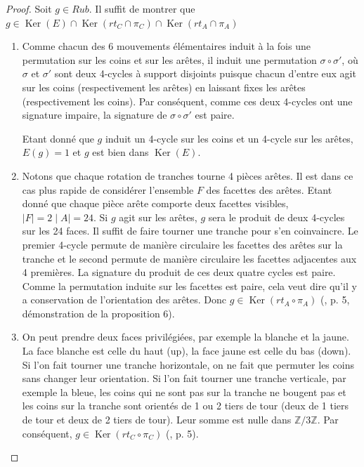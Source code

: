 \documentclass[french]{report}
\begin{document}
  \begin{proof}


    Soit $g \in Rub$. Il suffit de montrer que $g \in  \operatorname{Ker}(E ) \cap \operatorname{Ker}(rt_C \cap \pi_C) \cap \operatorname{Ker}(rt_A \cap \pi_A)$
    \begin{enumerate}
      \item Comme chacun des 6 mouvements élémentaires induit à la fois une permutation sur les coins et sur les arêtes, il induit une permutation $\sigma \circ \sigma'$, où $\sigma$ et $\sigma'$ sont deux 4-cycles à support disjoints puisque chacun d'entre eux agit sur les coins (respectivement les arêtes) en laissant fixes les arêtes (respectivement les coins). Par conséquent, comme ces deux 4-cycles ont une signature impaire, la signature de $\sigma \circ \sigma'$ est paire.

      Etant donné que $g$ induit un 4-cycle sur les coins et un 4-cycle sur les arêtes, $E (g) =1$ et $g$ est bien dans $\operatorname{Ker}(E )$.

      \item Notons que chaque rotation de tranches tourne 4 pièces arêtes. Il est dans ce cas plus rapide de considérer l'ensemble $F$ des facettes des arêtes. Etant donné que chaque pièce arête comporte deux facettes visibles, $\mid F \mid = 2 \mid A \mid = 24$. Si $g$ agit sur les arêtes, $g$ sera le produit de deux 4-cycles sur les 24 faces. Il suffit de faire tourner une tranche pour s'en coinvaincre. Le premier 4-cycle permute de manière circulaire les facettes des arêtes sur la tranche et le second permute de manière circulaire les facettes adjacentes aux 4 premières. La signature du produit de ces deux quatre cycles est paire. Comme la permutation induite sur les facettes est paire, cela veut dire qu'il y a conservation de l'orientation des arêtes. Donc $g \in \operatorname{Ker}(rt_A \circ \pi_A)$ (\cite{colmez_rubik}, p. 5, démonstration de la proposition 6).

      \item On peut prendre deux faces privilégiées, par exemple la blanche et la jaune. La face blanche est celle du haut (up), la face jaune est celle du bas (down). Si l'on fait tourner une tranche horizontale, on ne fait que permuter les coins sans changer leur orientation. Si l'on fait tourner une tranche verticale, par exemple la bleue, les coins qui ne sont pas sur la tranche ne bougent pas et les coins sur la tranche sont orientés de 1 ou 2 tiers de tour (deux de 1 tiers de tour et deux de 2 tiers de tour). Leur somme est nulle dans $\mathbb{Z}/{ 3 }\mathbb{Z}$. Par conséquent, $g \in \operatorname{Ker}(rt_C \circ \pi_C)$ (\cite{colmez_rubik}, p. 5).




\end{enumerate}
\end{proof}
\end{document}
